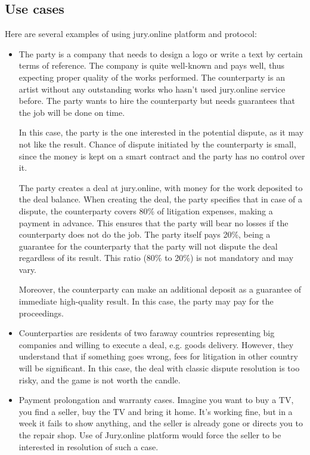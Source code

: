\documentclass[12pt]{article}
\begin{document}
\subsection{Use cases}
Here are several examples of using jury.online platform and protocol:
\begin{itemize}
		\item The party is a company
				that needs to design a logo or write a text by certain terms of reference. The company is quite well-known and pays well, thus expecting
				proper quality of the works performed. The counterparty is an artist without any outstanding works who hasn’t used jury.online service
				before. The party wants to hire the counterparty but needs guarantees that the job will be done on time.

				In this case, the party is the one interested in the potential dispute, as it may not like the result. Chance of dispute initiated by the
				counterparty is small, since the money is kept on a smart contract and the party has no control over it.

				The party creates a deal at jury.online, with money for the work deposited to the deal balance. When creating the deal, the party specifies
				that in case of a dispute, the counterparty covers 80\% of litigation expenses, making a payment in advance. This ensures that the party will
				bear no losses if the counterparty does not do the job. The party itself pays 20\%, being a guarantee for the counterparty that the party
				will not dispute the deal regardless of its result. This ratio (80\% to 20\%) is not mandatory and may vary.

				Moreover, the counterparty can make an additional deposit as a guarantee of immediate high-quality result. In this case, the party may pay
				for the proceedings.

		\item Counterparties are residents of two faraway countries representing big companies and willing to execute a deal, e.g. goods delivery.
				However, they understand that if something goes wrong, fees for litigation in other country will be significant. In this case, the deal with
				classic dispute resolution is too risky, and the game is not worth the candle.


		\item Payment prolongation and warranty cases.  Imagine you want to buy a TV, you find a seller, buy the TV and bring it home. It’s working
				fine, but in a week it fails to show anything, and the seller is already gone or directs you to the repair shop. Use of Jury.online platform
				would force the seller to be interested in resolution of such a case.


\end{itemize}
\end{document}
